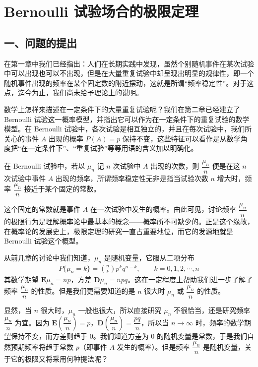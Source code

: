 \documentclass[../../main.tex]{subfiles}
\begin{document}
\section{Bernoulli 试验场合的极限定理}\label{section:ch05-Bernoulli试验场合极限定理}

\subsection*{一、问题的提出}

在第一章中我们已经指出：人们在长期实践中发现，虽然个别随机事件在某次试验中可以出现也可以不出现，但是在大量重复试验中却呈现出明显的规律性，即一个随机事件出现的频率在某个固定数的附近摆动，这就是所谓``频率稳定性''。对于这点，迄今为止，我们尚未给予理论上的说明。

数学上怎样来描述在一定条件下的大量重复试验呢？我们在第二章已经建立了 Bernoulli 试验这一概率模型，并指出它可以作为在一定条件下的重复试验的数学模型。在 Bernoulli 试验中，各次试验是相互独立的，并且在每次试验中，我们所关心的事件 $A$ 出现的概率 $P(A)=p$ 保持不变，这些特征可以看作是从数学角度把``在一定条件下''、``重复试验''等等用语的含义加以明确化。

在 Bernoulli 试验中，若以 $\mu_n$ 记 $n$ 次试验中 $A$ 出现的次数，则 $\dfrac{\mu_n}{n}$ 便是在这 $n$ 次试验中事件 $A$ 出现的频率，所谓频率稳定性无非是指当试验次数 $n$ 增大时，频率 $\dfrac{\mu_n}{n}$ 接近于某个固定的常数。

这个固定的常数就是事件 $A$ 在一次试验中发生的概率。由此可见，讨论频率 $\dfrac{\mu_n}{n}$ 的极限行为是理解概率论中最基本的概念——概率所不可缺少的。正是这个缘故，在概率论的发展史上，极限定理的研究一直占重要地位，而它的发源地就是 Bernoulli 试验这个概型。

从前几章的讨论中我们知道，$\mu_n$ 是随机变量，它服从二项分布
\begin{align}
P\{\mu_n=k\}=\binom{n}{k}p^{k}q^{n-k},\qquad k=0,1,2,\cdots,n
\end{align}
其数学期望 $\boldsymbol{E}\mu_n=np$，方差 $\boldsymbol{D}\mu_n=npq$。这在一定程度上帮助我们进一步了解了频率 $\dfrac{\mu_n}{n}$ 的性质。但是我们更需要知道的是 $n$ 很大时 $\mu_n$ 或 $\dfrac{\mu_n}{n}$ 的性质。

显然，当 $n$ 很大时，$\mu_n$ 一般也很大，所以直接研究 $\mu_n$ 不很恰当，还是研究频率 $\dfrac{\mu_n}{n}$ 为宜。因为 $\boldsymbol{E}\!\left(\dfrac{\mu_n}{n}\right)=p$，$\boldsymbol{D}\!\left(\dfrac{\mu_n}{n}\right)=\dfrac{pq}{n}$，所以当 $n\to\infty$ 时，频率的数学期望保持不变，而方差则趋于 $0$。我们知道方差为 $0$ 的随机变量是常数，于是我们自然预期频率将趋于常数 $p$（即事件 $A$ 发生的概率）。但是频率 $\dfrac{\mu_n}{n}$ 是随机变量，关于它的极限又将采用何种提法呢？
\end{document}
